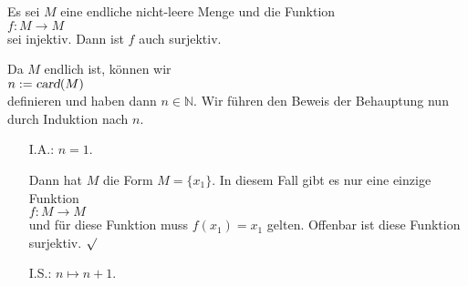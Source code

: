 \begin{Satz}
  Es sei $M$ eine endliche nicht-leere Menge und die Funktion 
\\[0.2cm]
\hspace*{1.3cm}
$f:M \rightarrow M$
\\[0.2cm]
sei injektiv.  Dann ist $f$ auch surjektiv.
\eox
\end{Satz}

\proof
Da $M$ endlich ist, können wir
\\[0.2cm]
\hspace*{1.3cm}
$n := \textsl{card}(M)$
\\[0.2cm]
definieren und haben dann $n \in \mathbb{N}$.  Wir führen den Beweis der Behauptung nun durch
Induktion nach $n$.
\begin{enumerate}
\item[I.A.:] $n = 1$.

             Dann hat $M$ die Form $M = \{ x_1 \}$.  In diesem Fall gibt es nur eine einzige Funktion
             \\[0.2cm]
             \hspace*{1.3cm}
             $f: M \rightarrow M$
             \\[0.2cm]
             und für diese Funktion muss $f(x_1) = x_1$ gelten.  Offenbar ist diese Funktion 
             surjektiv. $\surd$
\item[I.S.:] $n \mapsto n+1$.


\end{enumerate}
